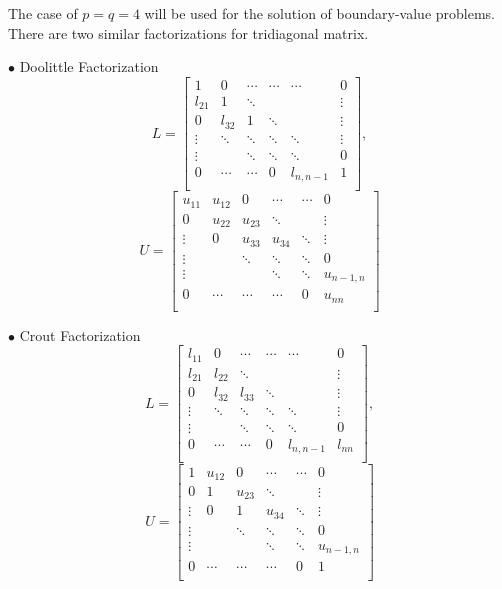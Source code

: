 \documentclass[preprint,12pt]{elsarticle}
\begin{document}
The case of $p=q=4$ will be used for the solution of boundary-value problems. There are two similar factorizations for tridiagonal matrix.

\noindent $\bullet$ Doolittle Factorization
\[L=
\begin{bmatrix}
 1& 0 &\cdots   & \cdots & \cdots & 0 \\
  l_{21} & 1 & \ddots &  &  & \vdots \\
  0 & l_{32} & 1 & \ddots &  & \vdots \\
  \vdots & \ddots & \ddots & \ddots & \ddots &  \vdots\\
  \vdots &  & \ddots & \ddots &  \ddots& 0 \\
  0 & \cdots & \cdots & 0 & l_{n,n-1} & 1 \\
\end{bmatrix},
\]
\[U=
\begin{bmatrix}
  u_{11} & u_{12} & 0 & \cdots & \cdots & 0 \\
  0 & u_{22} & u_{23} & \ddots &  & \vdots \\
  \vdots & 0 & u_{33} & u_{34} & \ddots & \vdots \\
 \vdots &  & \ddots & \ddots & \ddots & 0\\
  \vdots &  &  & \ddots & \ddots &u_{n-1,n}  \\
 0 & \cdots & \cdots & \cdots & 0 & u_{nn} \\
\end{bmatrix}
\]

\noindent $\bullet$ Crout Factorization
\[L=
\begin{bmatrix}
 l_{11}& 0 &\cdots   & \cdots & \cdots & 0 \\
  l_{21} & l_{22} & \ddots &  &  & \vdots \\
  0 & l_{32} & l_{33} & \ddots &  & \vdots \\
  \vdots & \ddots & \ddots & \ddots & \ddots &  \vdots\\
  \vdots &  & \ddots & \ddots &  \ddots& 0 \\
  0 & \cdots & \cdots & 0 & l_{n,n-1} & l_{nn} \\
\end{bmatrix},
\]
\[U=
\begin{bmatrix}
  1 & u_{12} & 0 & \cdots & \cdots & 0 \\
  0 & 1 & u_{23} & \ddots &  & \vdots \\
  \vdots & 0 & 1 & u_{34} & \ddots & \vdots \\
 \vdots &  & \ddots & \ddots & \ddots & 0\\
  \vdots &  &  & \ddots & \ddots &u_{n-1,n}  \\
 0 & \cdots & \cdots & \cdots & 0 & 1 \\
\end{bmatrix}
\]
\end{document}
